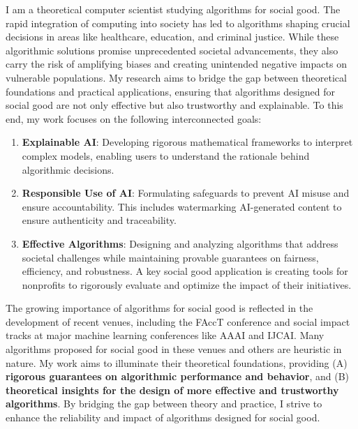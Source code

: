 \documentclass[11pt]{article}
\begin{document}
{\setlength{\parindent}{0cm}

I am a theoretical computer scientist studying algorithms for social good.
The rapid integration of computing into society has led to algorithms shaping crucial decisions in areas like healthcare, education, and criminal justice. While these algorithmic solutions promise unprecedented societal advancements, they also carry the risk of amplifying biases and creating unintended negative impacts on vulnerable populations. My research aims to bridge the gap between theoretical foundations and practical applications, ensuring that algorithms designed for social good are not only effective but also trustworthy and explainable. To this end, my work focuses on the following interconnected goals:
\begin{enumerate}
    \item \textbf{Explainable AI}: Developing rigorous mathematical frameworks to interpret complex models, enabling users to understand the rationale behind algorithmic decisions.
    \item \textbf{Responsible Use of AI}: Formulating safeguards to prevent AI misuse and ensure accountability. This includes watermarking AI-generated content to ensure authenticity and traceability.
    \item \textbf{Effective Algorithms}: Designing and analyzing algorithms that address societal challenges while maintaining provable guarantees on fairness, efficiency, and robustness. A key social good application is creating tools for nonprofits to rigorously evaluate and optimize the impact of their initiatives.
\end{enumerate}

The growing importance of algorithms for social good is reflected in the development of recent venues, including the FAccT conference and social impact tracks at major machine learning conferences like AAAI and IJCAI.
Many algorithms proposed for social good in these venues and others are heuristic in nature. My work aims to illuminate their theoretical foundations, providing (A) \textbf{rigorous guarantees on algorithmic performance and behavior}, and (B) \textbf{theoretical insights for the design of more effective and trustworthy algorithms}.
By bridging the gap between theory and practice, I strive to enhance the reliability and impact of algorithms designed for social good.

}
\end{document}

